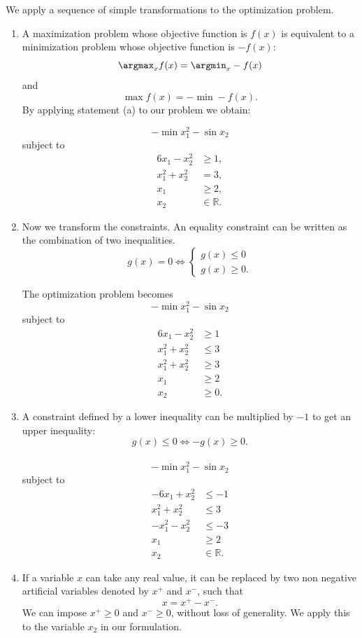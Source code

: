 
 We apply a sequence of  simple transformations to
  the optimization problem.

\begin{enumerate}
\item A maximization problem whose objective function is $f(x)$ is equivalent to a minimization problem whose objective function is $-f(x)$:
$$\argmax_x f(x)=\argmin_x-f(x)$$
and
$$\max f(x)=-\min -f(x).$$
By applying statement (a) to our problem we obtain:

\[
-\min x_1^2-\sin x_2
\]
subject to
\begin{align*}
6x_1 -x_2^2 & \geq 1,\\
x_1^2 +x_2^2 & = 3,\\
x_1 & \geq 2,\\
x_2 & \in \mathbb{R}.
\end{align*}

\item Now we transform the constraints.
  An equality constraint can be written as the combination of two inequalities.
$$g(x)=0 \Longleftrightarrow  \left\{ \begin{array}{l} g(x) \leq 0 \\
    g(x) \geq 0. \end{array} \right. $$

The optimization problem becomes 
\[
-\min x_1^2-\sin x_2
\]
subject to
\begin{align*}
6x_1-x_2^2  & \geq 1\\
x_1^2+x_2^2 & \leq 3\\
x_1^2+x_2^2 & \geq 3\\
x_1 & \geq 2\\
x_2 & \geq 0.
\end{align*}


\item A constraint defined by a lower inequality can be multiplied by $-1$ to get an upper inequality:
$$g(x) \leq 0 \Longleftrightarrow  -g(x)\geq 0.$$
\
$$-\min x_1^2-\sin x_2$$
subject to
\begin{align*}
-6x_1 +x_2^2  & \leq -1\\
x_1^2+x_2^2 & \leq 3\\
-x_1^2-x_2^2 & \leq -3\\
x_1 & \geq 2\\
x_2 & \in \mathbb{R}.
\end{align*}


\item If a variable $x$ can take any real value, it can be replaced by two non negative artificial variables denoted by $x^+$ and $x^-$, such that
$$
x=  x^+-x^-.
$$
We can impose $x^+\geq 0$ and $x^- \geq 0$, without loss of
generality. We apply this to the variable $x_2$ in our formulation.\\


\end{enumerate}
